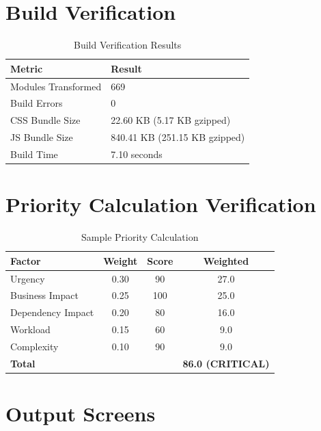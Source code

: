 \documentclass[12pt,a4paper,oneside]{report}
\begin{document}
\section{Build Verification}

\begin{table}[H]
\centering
\caption{Build Verification Results}
\label{tab:build}
\begin{tabular}{|l|l|}
\hline
\textbf{Metric} & \textbf{Result} \\
\hline
Modules Transformed & 669 \\
Build Errors & 0 \\
CSS Bundle Size & 22.60 KB (5.17 KB gzipped) \\
JS Bundle Size & 840.41 KB (251.15 KB gzipped) \\
Build Time & 7.10 seconds \\
\hline
\end{tabular}
\end{table}

\section{Priority Calculation Verification}

\begin{table}[H]
\centering
\caption{Sample Priority Calculation}
\label{tab:pricalc}
\begin{tabular}{|l|c|c|c|}
\hline
\textbf{Factor} & \textbf{Weight} & \textbf{Score} & \textbf{Weighted} \\
\hline
Urgency           & 0.30 & 90  & 27.0 \\
Business Impact   & 0.25 & 100 & 25.0 \\
Dependency Impact & 0.20 & 80  & 16.0 \\
Workload          & 0.15 & 60  & 9.0  \\
Complexity        & 0.10 & 90  & 9.0  \\
\hline
\textbf{Total}    &      &     & \textbf{86.0 (CRITICAL)} \\
\hline
\end{tabular}
\end{table}

\section{Output Screens}

\end{document}
